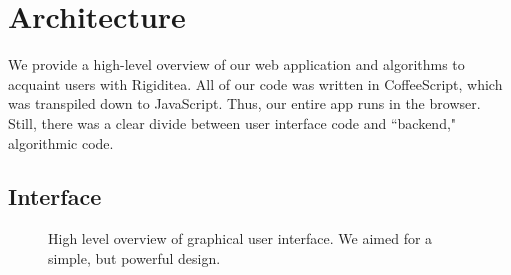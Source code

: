 \documentclass[aps,prd,final,twocolumn,letterpaper,nofootinbib]{revtex4-1}
\begin{document}
\section{Architecture}
\label{sec:arch}

We provide a high-level overview of our web application
and algorithms to acquaint users with Rigiditea.
All of our code was written in CoffeeScript,
which was transpiled down to JavaScript.
Thus, our entire app runs in the browser.
Still, there was a clear divide between user interface code
and ``backend," algorithmic code.

\subsection{Interface}

\begin{figure}[ht]
\caption{High level overview of graphical user interface.
We aimed for a simple, but powerful design.}
\label{fig:ui}
\end{figure}
\end{document}
